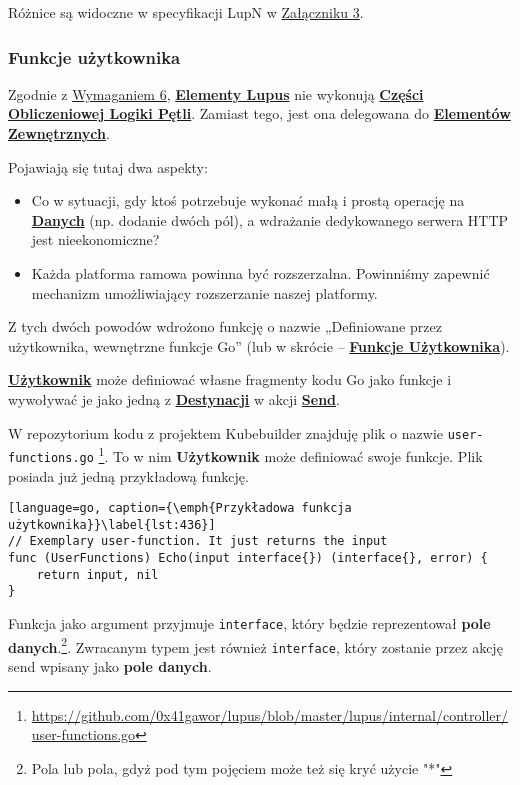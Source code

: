 Różnice są widoczne w specyfikacji LupN w \hyperlink{appendix:3}{Załączniku 3}.

\subsubsection{Funkcje użytkownika}\label{sec:funkcje-uzytkownika}

Zgodnie z \hyperref[req:6]{Wymaganiem 6}, \hyperlink{def:element-lupus}{\textbf{Elementy Lupus}} nie wykonują \hyperlink{def:czesc-obliczeniowa}{\textbf{Części Obliczeniowej Logiki Pętli}}. Zamiast tego, jest ona delegowana do \hyperlink{def:element-zewnetrzny}{\textbf{Elementów Zewnętrznych}}.

Pojawiają się tutaj dwa aspekty:
\begin{itemize}
    \item Co w sytuacji, gdy ktoś potrzebuje wykonać małą i prostą operację na \hyperlink{def:dane}{\textbf{Danych}} (np. dodanie dwóch pól), a wdrażanie dedykowanego serwera HTTP jest nieekonomiczne?
    \item Każda platforma ramowa powinna być rozszerzalna. Powinniśmy zapewnić mechanizm umożliwiający rozszerzanie naszej platformy.
\end{itemize}

Z tych dwóch powodów wdrożono funkcję o nazwie „Definiowane przez użytkownika, wewnętrzne funkcje Go” (lub w skrócie – \hyperlink{def:funkcje-uzytkownika}{\textbf{Funkcje Użytkownika}}).

\hyperlink{def:uzytkownik}{\textbf{Użytkownik}} może definiować własne fragmenty kodu Go jako funkcje i wywoływać je jako jedną z \hyperlink{def:destynacja}{\textbf{Destynacji}} w akcji \hyperlink{def:akcja}{\textbf{Send}}.

W repozytorium kodu z projektem Kubebuilder znajduję plik o nazwie \texttt{user-functions.go} \footnote{\url{https://github.com/0x41gawor/lupus/blob/master/lupus/internal/controller/user-functions.go}}. To w nim \textbf{Użytkownik} może definiować swoje funkcje. Plik posiada już jedną przykładową funkcję.

\begin{lstlisting}[language=go, caption={\emph{Przykładowa funkcja użytkownika}}\label{lst:436}]
// Exemplary user-function. It just returns the input
func (UserFunctions) Echo(input interface{}) (interface{}, error) {
	return input, nil
}
\end{lstlisting}

Funkcja jako argument przyjmuje \texttt{interface{}}, który będzie reprezentował \textbf{pole danych}.\footnote{Pola lub pola, gdyż pod tym pojęciem może też się kryć użycie "*"}. Zwracanym typem jest również \texttt{interface{}}, który zostanie przez akcję send wpisany jako \textbf{pole danych}.

